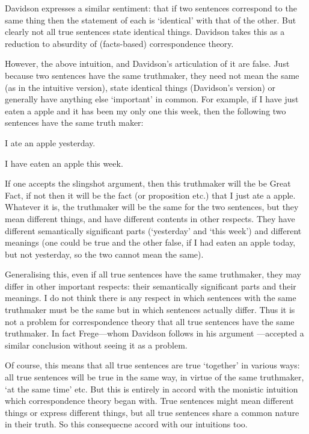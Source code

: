 Davidson expresses a similar sentiment: that if two sentences correspond to the same thing then the statement of each is `identical' with that of the other.
But clearly not all true sentences state identical things.
Davidson takes this as a reduction to absurdity of (facts-based) correspondence theory. %
\parencite[750]{Davidson_1969}

However, the above intuition, and Davidson's articulation of it are false.
Just because two sentences have the same truthmaker, they need not mean the same (as in the intuitive version), state identical things (Davidson's version) or generally have anything else `important' in common.
For example, if I have just eaten a apple and it has been my only one this week, then the following two sentences have the same truth maker:

	\begin{example} \label{yesterday}
	I ate an apple yesterday.
	\end{example}

	\begin{example} \label{week}
	I have eaten an apple this week.
	\end{example}

If one accepts the slingshot argument, then this truthmaker will the be Great Fact, if not then it will be the fact (or proposition etc.) that I just ate a apple.
Whatever it is, the truthmaker will be the same for the two sentences, but they mean different things, and have different contents in other respects.
They have different semantically significant parts (`yesterday' and `this week') and different meanings (one could be true and the other false, if I had eaten an apple today, but not yesterday, so the two cannot mean the same).

Generalising this, even if all true sentences have the same truthmaker, they may differ in other important respects: their semantically significant parts and their meanings.
I do not think there is any respect in which sentences with the same truthmaker must be the same but in which sentences actually differ.
Thus it is not a problem for correspondence theory that all true sentences have the same truthmaker.
In fact Frege---whom Davidson follows in his argument \parencite[750]{Davidson_1969}---accepted a similar conclusion without seeing it as a problem.
\parencite[216]{Frege_1948}

Of course, this means that all true sentences are true `together' in various ways: all true sentences will be true in the same way, in virtue of the same truthmaker, `at the same time' etc.
But this is entirely in accord with the monistic intuition which correspondence theory began with.
True sentences might mean different things or express different things, but all true sentences share a common nature in their truth.
So this consequecne accord with our intuitions too.
